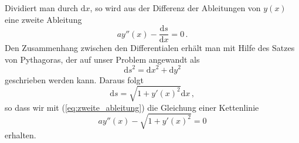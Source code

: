 \documentclass[twocolumn,aps]{revtex4}
\begin{document}
Dividiert man durch $\mathrm{d}x$, so wird aus der Differenz der
Ableitungen von $y(x)$ eine zweite Ableitung
\begin{equation}
 ay''(x)-\frac{\mathrm{d}s}{\mathrm{d}x} = 0\,.
 \label{eq:zweite_ableitung}
\end{equation}
Den Zusammenhang zwischen den Differentialen erhält man mit Hilfe des
Satzes von Pythagoras, der auf unser Problem angewandt als
\begin{equation}
 \mathrm{d}s^2 = \mathrm{d}x^2+\mathrm{d}y^2
\end{equation}
geschrieben werden kann. Daraus folgt
\begin{equation}
 \mathrm{d}s = \sqrt{1+y'(x)^2}\mathrm{d}x\,,
\end{equation}
so dass wir mit (\ref{eq:zweite_ableitung}) die Gleichung einer
Kettenlinie
\begin{equation}
 ay''(x)-\sqrt{1+y'(x)^2} = 0
\end{equation}
erhalten.
\end{document}
